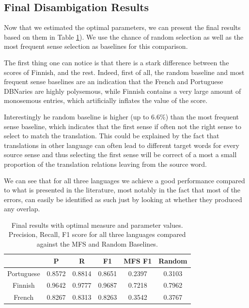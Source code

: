 \documentclass[10pt, a4paper]{article}
\begin{document}
\subsection{Final Disambigation Results}

Now that we estimated the optimal parameters, we can present the final results based on them in Table \ref{tab:final}). We use the chance of random selection as well as the most frequent sense selection as baselines for this comparison.

The first thing one can notice is that there is a stark difference between the scores of Finnish, and the rest. Indeed, first of all, the random baseline and most frequent sense baselines are an indication that the French and Portuguese DBNaries are highly polysemous, while Finnish contains a very large amount of monosemous entries, which artificially inflates the value of the score. 

Interestingly he random baseline is higher (up to 6.6\%) than the most frequent sense baseline, which indicates that the first sense if often not the right sense to select to match the translation. This could be explained by the fact that translations in other language can often lead to different target words for every source sense and thus selecting the first sense will be correct of a most a small proportion of the translation relations leaving from the source word.

We can see that for all three languages we achieve a good performance compared to what is presented in the literature, most notably in the fact that most of the errors, can easily be identified as such just by looking at whether they produced any overlap.

\begin{table}
{\centering \footnotesize
\begin{tabular}{|c|c|c|c|c|c|}
\hline &P&R&F1&MFS F1&Random\\
\hline Portuguese&0.8572&0.8814&0.8651&0.2397&0.3103\\
\hline Finnish&0.9642&0.9777&0.9687&0.7218&0.7962\\
\hline French&0.8267&0.8313&0.8263&0.3542&0.3767\\
\hline 
\end{tabular}
\caption{Final results with optimal measure and parameter values. Precision, Recall, F1 score for all three languages compared against the MFS and Random Baselines.}
\label{tab:final}
}
\end{table} 
\end{document}

